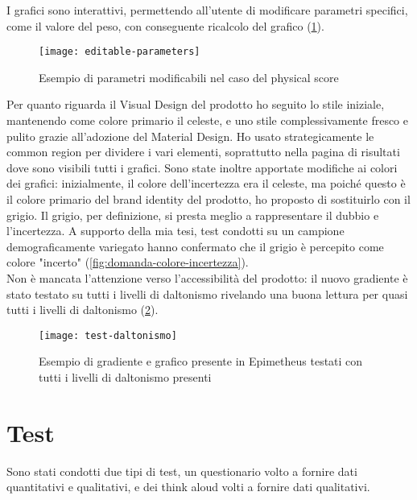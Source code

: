 
I grafici sono interattivi, permettendo all'utente di modificare parametri specifici, come il valore del peso, con conseguente ricalcolo del grafico (\ref{fig:editable-parameters}).\\ 

\begin{figure}[!ht] 
    \centering 
    \texttt{[image: editable-parameters]} 
    \caption{Esempio di parametri modificabili nel caso del physical score}
    \label{fig:editable-parameters}
\end{figure}

Per quanto riguarda il Visual Design del prodotto ho seguito lo stile iniziale, mantenendo come colore primario il celeste, e uno stile complessivamente fresco e pulito grazie all'adozione del Material Design. Ho usato strategicamente le common region per dividere i vari elementi, soprattutto nella pagina di risultati dove sono visibili tutti i grafici. 
Sono state inoltre apportate modifiche ai colori dei grafici: inizialmente, il colore dell'incertezza era il celeste, ma poiché questo è il colore primario del brand identity del prodotto, ho proposto di sostituirlo con il grigio. Il grigio, per definizione, si presta meglio a rappresentare il dubbio e l'incertezza. A supporto della mia tesi, test condotti su un campione demograficamente variegato hanno confermato che il grigio è percepito come colore "incerto" (\ref{fig:domanda-colore-incertezza}).\\

Non è mancata l'attenzione verso l'accessibilità del prodotto: il nuovo gradiente è stato testato su tutti i livelli di daltonismo rivelando una buona lettura per quasi tutti i livelli di daltonismo (\ref{fig:test-daltonismo}). 

\begin{figure}[!ht] 
    \centering 
    \texttt{[image: test-daltonismo]} 
    \caption{Esempio di gradiente e grafico presente in Epimetheus testati con tutti i livelli di daltonismo presenti}
    \label{fig:test-daltonismo}
\end{figure}

\section{Test}
Sono stati condotti due tipi di test, un questionario volto a fornire dati quantitativi e qualitativi, e dei think aloud volti a fornire dati qualitativi. \\

